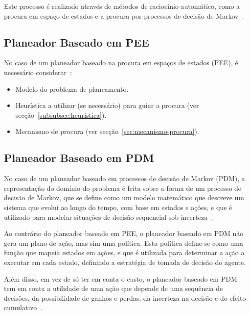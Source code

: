 Este processo é realizado através de métodos de raciocínio automático, como a procura em
espaço de estados e a procura por processos de decisão de Markov~\cite{isel:iasa:slides:plan-autom-pee}.

\subsection{Planeador Baseado em PEE}\label{subsec:planeador-baseado-em-pee}

No caso de um planeador baseado na procura em espaços de estados (PEE), é necessário considerar~\cite{isel:iasa:slides:plan-autom-pee}:

\begin{itemize}
    \label{itemize:planeador-baseado-em-pee}
    \item Modelo do problema de planeamento.
    \item Heurística a utilizar (se necessário) para guiar a procura (ver secção~\ref{subsubsec:heuristica}).
    \item Mecanismo de procura (ver secção~\ref{sec:mecanismo-procura}).
\end{itemize}

\subsection{Planeador Baseado em PDM}\label{subsec:planeador-baseado-em-pdm}

No caso de um planeador baseado em processos de decisão de Markov (PDM), a representação do domínio do problema é feita sobre a forma de um processo de decisão de Markov, que se define como um modelo matemático que descreve um sistema que evolui ao longo do tempo, com base em estados e ações, e que é utilizado para modelar situações de decisão sequencial sob incerteza~\cite{isel:iasa:slides:plan-autom-pdm}.

Ao contrário do planeador baseado em PEE, o planeador baseado em PDM não gera um plano de ação, mas sim uma política.
Esta política define-se como uma função que mapeia estados em ações, e que é utilizada para determinar a ação a executar em cada estado, definindo a estratégia de tomada de decisão do agente.

Além disso, em vez de só ter em conta o custo, o planeador baseado em PDM tem em conta a utilidade de uma ação que depende de uma sequência de decisões, da possibilidade de ganhos e perdas, da incerteza na decisão e do efeito cumulativo~\cite{isel:iasa:slides:processos-decisao-sequencial}.


